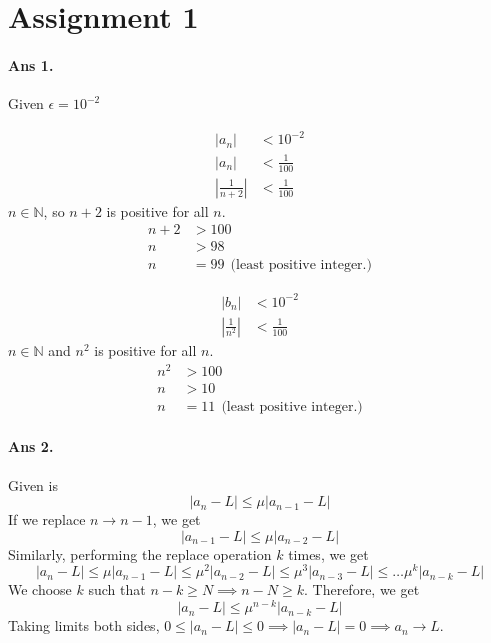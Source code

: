 \documentclass[12pt]{report}
\title{
\author{Devansh Tripathi\\ IMS22090\\ Lecturer: Dr. Asha K. Dond}
}
\begin{document}
\maketitle
\section*{Assignment 1}
\paragraph*{Ans 1.} Given $\epsilon = 10^{-2}$\\
\begin{minipage}{0.5\textwidth}
    \begin{align*}
        |a_n| &< 10^{-2}\\
        |a_n| &< \frac{1}{100}\\
        \left|\frac{1}{n+2}\right| &< \frac{1}{100}
    \end{align*}
    $n\in\mathbb{N}$, so $n+2$ is positive for all $n$.
    \begin{align*}
        n+2 &> 100\\
        n &> 98\\
        n &= 99 ~~\text{(least positive integer.)}
    \end{align*} 
\end{minipage}%
\begin{minipage}{0.5\textwidth}
    \begin{align*}
        |b_n| &< 10^{-2}\\
        \left|\frac{1}{n^2}\right| &< \frac{1}{100}
    \end{align*}
    $n\in \mathbb{N}$ and $n^2$ is positive for all $n$.
    \begin{align*}
        n^2 &> 100\\
        n &> 10\\
        n &= 11 ~~\text{(least positive integer.)}
    \end{align*}
\end{minipage}
\paragraph*{Ans 2.} Given is 
$$ |a_n - L| \leq \mu|a_{n-1} - L|$$
If we replace $n \to n-1$, we get 
$$|a_{n-1} - L| \leq \mu|a_{n-2} - L|$$
Similarly, performing the replace operation $k$ times, we get
$$ |a_n - L| \leq \mu|a_{n-1} - L| \leq \mu^2|a_{n-2} - L| \leq \mu^3|a_{n-3} - L| \leq \dots \mu^k|a_{n-k} - L|$$ 
We choose $k$ such that $n-k \geq N \implies n-N \geq k$. Therefore, we get
$$ |a_n - L| \leq \mu^{n-k}|a_{n-k} - L|$$
Taking limits both sides,
$ 0 \leq |a_n - L | \leq 0 \implies |a_n - L| = 0 \implies a_n \to L$. 
\end{document}
